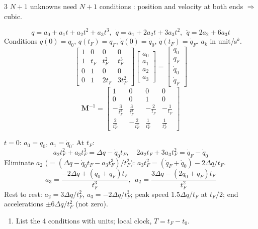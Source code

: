 \begin{multicols}{3}
$N{+}1$ unknowns need $N{+}1$ conditions : position and velocity at both ends $\Rightarrow$ cubic.
\begin{fbx}[Cubic, $t_0=0$ \pg{16}]
\[q=a_0+a_1t+a_2t^2+a_3t^3,\ \ \dot q=a_1+2a_2t+3a_3t^2,\ \ \ddot q=2a_2+6a_3t\]
Conditions $q(0)=q_0$, $q(t_F)=q_F$, $\dot q(0)=\dot q_0$, $\dot q(t_F)=\dot q_F$. $a_k$ in unit/s$^k$.
\[\begin{bmatrix}1&0&0&0\\1&t_F&t_F^2&t_F^3\\0&1&0&0\\0&1&2t_F&3t_F^2\end{bmatrix}\!\begin{bmatrix}a_0\\a_1\\a_2\\a_3\end{bmatrix}=\begin{bmatrix}q_0\\q_F\\\dot q_0\\\dot q_F\end{bmatrix}\]
\[\mathbf M^{-1}=\begin{bmatrix}1&0&0&0\\0&0&1&0\\-\frac3{t_F^2}&\frac3{t_F^2}&-\frac2{t_F}&-\frac1{t_F}\\[1mm]\frac2{t_F^3}&-\frac2{t_F^3}&\frac1{t_F^2}&\frac1{t_F^2}\end{bmatrix}\]
\end{fbx}
\begin{deriv}[four coefficients; $\Delta q=q_F-q_0$]
$t=0$: $a_0=q_0$, $a_1=\dot q_0$. At $t_F$:
\[a_2t_F^2+a_3t_F^3=\Delta q-\dot q_0t_F,\quad 2a_2t_F+3a_3t_F^2=\dot q_F-\dot q_0\]
Eliminate $a_2$ ($=(\Delta q-\dot q_0t_F-a_3t_F^3)/t_F^2$): $a_3t_F^2=(\dot q_F+\dot q_0)-2\Delta q/t_F$.
\[\boxed{a_3=\frac{-2\Delta q+(\dot q_0+\dot q_F)t_F}{t_F^3}},\ \ \boxed{a_2=\frac{3\Delta q-(2\dot q_0+\dot q_F)t_F}{t_F^2}}\]
Rest to rest: $a_2=3\Delta q/t_F^2$, $a_3=-2\Delta q/t_F^3$; peak speed $1.5\Delta q/t_F$ at $t_F/2$; end accelerations $\pm6\Delta q/t_F^2$ (not zero). \chk
\end{deriv}
\begin{recipe}
\begin{enumerate}
\item List the 4 conditions with units; local clock, $T=t_F-t_0$.

\end{enumerate}
\end{recipe}
\end{multicols}
